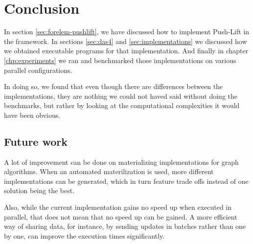 \chapter{Conclusion}

In section \ref{sec:forelem-pushlift}, we have discussed how to implement Push-Lift in the \forelem framework. In sections \ref{sec:das4} and \ref{sec:implementations} we discussed how we obtained executable programs for that implementation. And finally in chapter \ref{chp:experiments} we ran and benchmarked those implementations on various parallel configurations.

In doing so, we found that even though there are differences between the implementations, they are nothing we could not haved said without doing the benchmarks, but rather by looking at the computational complexities it would have been obvious.

\section{Future work}

A lot of improvement can be done on materializing implementations for graph algorithms. When an automated materilization is used, more different implementations can be generated, which in turn feature trade offs instead of one solution being the best.

Also, while the current implementation gains no speed up when executed in parallel, that does not mean that no speed up can be gained. A more efficient way of sharing data, for instance, by sending updates in batches rather than one by one, can improve the execution times significantly.
